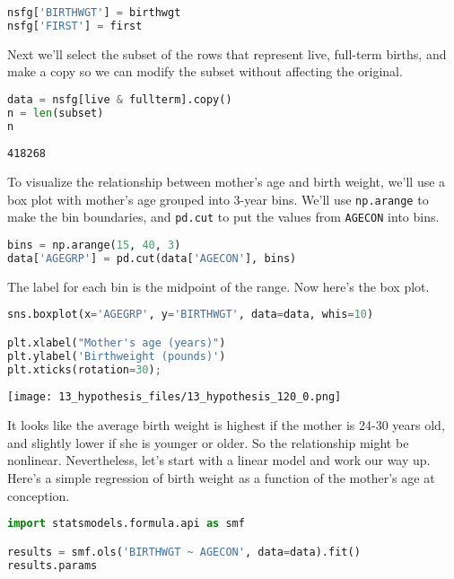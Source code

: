 \begin{lstlisting}[language=Python,style=source]
nsfg['BIRTHWGT'] = birthwgt
nsfg['FIRST'] = first
\end{lstlisting}

Next we'll select the subset of the rows that represent live, full-term
births, and make a copy so we can modify the subset without affecting
the original.

\begin{lstlisting}[language=Python,style=source]
data = nsfg[live & fullterm].copy()
n = len(subset)
n
\end{lstlisting}

\begin{lstlisting}[style=output]
418268
\end{lstlisting}

To visualize the relationship between mother's age and birth weight,
we'll use a box plot with mother's age grouped into 3-year bins. We'll
use \passthrough{\lstinline!np.arange!} to make the bin boundaries, and
\passthrough{\lstinline!pd.cut!} to put the values from
\passthrough{\lstinline!AGECON!} into bins.

\begin{lstlisting}[language=Python,style=source]
bins = np.arange(15, 40, 3)
data['AGEGRP'] = pd.cut(data['AGECON'], bins)
\end{lstlisting}

The label for each bin is the midpoint of the range. Now here's the box
plot.

\begin{lstlisting}[language=Python,style=source]
sns.boxplot(x='AGEGRP', y='BIRTHWGT', data=data, whis=10)

plt.xlabel("Mother's age (years)")
plt.ylabel('Birthweight (pounds)')
plt.xticks(rotation=30);
\end{lstlisting}

\begin{center}
\texttt{[image: 13\_hypothesis\_files/13\_hypothesis\_120\_0.png]}
\end{center}

It looks like the average birth weight is highest if the mother is 24-30
years old, and slightly lower if she is younger or older. So the
relationship might be nonlinear. Nevertheless, let's start with a linear
model and work our way up. Here's a simple regression of birth weight as
a function of the mother's age at conception.

\begin{lstlisting}[language=Python,style=source]
import statsmodels.formula.api as smf

results = smf.ols('BIRTHWGT ~ AGECON', data=data).fit()
results.params
\end{lstlisting}

